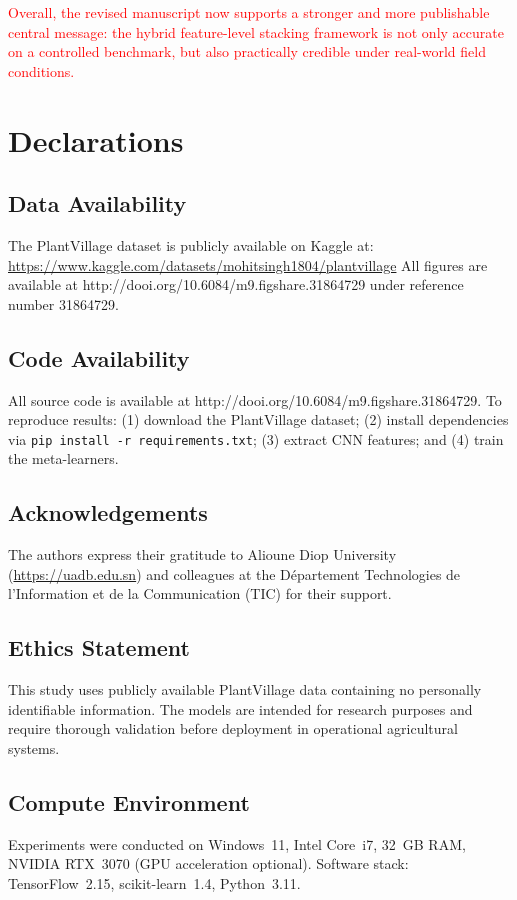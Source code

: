 \documentclass[pdflatex,sn-basic]{sn-jnl}
\begin{document}
\textcolor{red}{Overall, the revised manuscript now supports a stronger and more publishable central message: the hybrid feature-level stacking framework is not only accurate on a controlled benchmark, but also practically credible under real-world field conditions.}

\section*{Declarations}

\subsection*{Data Availability}
The PlantVillage dataset is publicly available on Kaggle at: \url{https://www.kaggle.com/datasets/mohitsingh1804/plantvillage}
All figures are available at http://dooi.org/10.6084/m9.figshare.31864729 under reference number 31864729.

\subsection*{Code Availability}
All source code is available at http://dooi.org/10.6084/m9.figshare.31864729. To reproduce results: (1) download the PlantVillage dataset; (2) install dependencies via \texttt{pip install -r requirements.txt}; (3) extract CNN features; and (4) train the meta-learners.

\subsection*{Acknowledgements}
The authors express their gratitude to Alioune Diop University (\url{https://uadb.edu.sn}) and colleagues at the Département Technologies de l'Information et de la Communication (TIC) for their support.

\subsection*{Ethics Statement}
This study uses publicly available PlantVillage data containing no personally identifiable information. The models are intended for research purposes and require thorough validation before deployment in operational agricultural systems.

\subsection*{Compute Environment}
Experiments were conducted on Windows~11, Intel Core~i7, 32~GB RAM, NVIDIA RTX~3070 (GPU acceleration optional). Software stack: TensorFlow~2.15, scikit-learn~1.4, Python~3.11.
\end{document}
